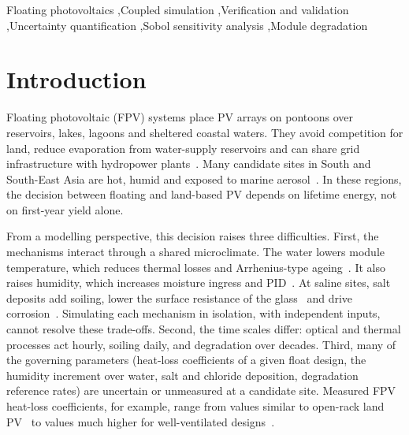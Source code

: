 \documentclass[preprint,11pt]{elsarticle}
\begin{document}
\begin{frontmatter}
\begin{keyword}
Floating photovoltaics \sep Coupled simulation \sep Verification and validation \sep Uncertainty quantification
\sep Sobol sensitivity analysis \sep Module degradation
\end{keyword}

\end{frontmatter}
\onehalfspacing

\section{Introduction}\label{sec:intro}

Floating photovoltaic (FPV) systems place PV arrays on pontoons over reservoirs, lakes, lagoons and sheltered coastal
waters. They avoid competition for land, reduce evaporation from water-supply reservoirs and can share grid
infrastructure with hydropower plants~\cite{worldbank2019,sahu2016,trapani2015,oliveirapinto2020,kumar2021}. Many
candidate sites in South and South-East Asia are hot, humid and exposed to marine aerosol~\cite{makhija2023}. In these
regions, the decision between floating and land-based PV depends on lifetime energy, not on first-year yield alone.

From a modelling perspective, this decision raises three difficulties. First, the mechanisms interact through a shared
microclimate. The water lowers module temperature, which reduces thermal losses and Arrhenius-type
ageing~\cite{liu2018,dorenkamper2021,golroodbari2020}. It also raises humidity, which increases moisture ingress and
PID~\cite{peck1986,kempe2006,hoffmann2014,luo2017}. At saline sites, salt deposits add soiling, lower the surface
resistance of the glass~\cite{hacke2015,islam2018} and drive corrosion~\cite{iso9223}. Simulating each mechanism in
isolation, with independent inputs, cannot resolve these trade-offs. Second, the time scales differ: optical and thermal
processes act hourly, soiling daily, and degradation over decades. Third, many of the governing parameters (heat-loss
coefficients of a given float design, the humidity increment over water, salt and chloride deposition, degradation
reference rates) are uncertain or unmeasured at a candidate site. Measured FPV heat-loss coefficients, for example,
range from values similar to open-rack land PV~\cite{lindholm2021,nysted2024,firat2026} to values much higher for
well-ventilated designs~\cite{dorenkamper2021,wu2024,dorenkamper2024}.
\end{document}
